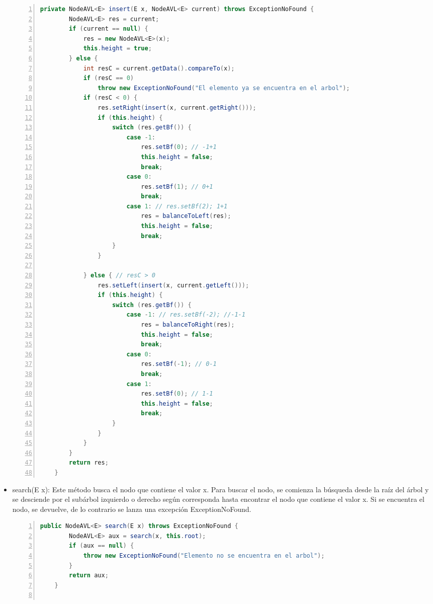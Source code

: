 \documentclass{article}
\begin{document}
\begin{itemize}
\begin{lstlisting}[language=Java, caption=Método insert(E x), numbers=left]
    private NodeAVL<E> insert(E x, NodeAVL<E> current) throws ExceptionNoFound {
        NodeAVL<E> res = current;
        if (current == null) {
            res = new NodeAVL<E>(x);
            this.height = true;
        } else {
            int resC = current.getData().compareTo(x);
            if (resC == 0)
                throw new ExceptionNoFound("El elemento ya se encuentra en el arbol");
            if (resC < 0) {
                res.setRight(insert(x, current.getRight()));
                if (this.height) {
                    switch (res.getBf()) {
                        case -1:
                            res.setBf(0); // -1+1
                            this.height = false;
                            break;
                        case 0:
                            res.setBf(1); // 0+1
                            break;
                        case 1: // res.setBf(2); 1+1
                            res = balanceToLeft(res);
                            this.height = false;
                            break;
                    }
                }
    
            } else { // resC > 0
                res.setLeft(insert(x, current.getLeft()));
                if (this.height) {
                    switch (res.getBf()) {
                        case -1: // res.setBf(-2); //-1-1
                            res = balanceToRight(res);
                            this.height = false;
                            break;
                        case 0:
                            res.setBf(-1); // 0-1
                            break;
                        case 1:
                            res.setBf(0); // 1-1
                            this.height = false;
                            break;
                    }
                }
            }
        }
        return res;
    }
                            \end{lstlisting}
                    \item search(E x): Este método busca el nodo que contiene el valor x. Para buscar el nodo, se comienza la búsqueda desde la raíz del árbol y se desciende por el subárbol izquierdo o derecho según corresponda hasta encontrar el nodo que contiene el valor x. Si se encuentra el nodo, se devuelve, de lo contrario se lanza una excepción ExceptionNoFound.
                            \begin{lstlisting}[language=Java, caption=Método search(E x), numbers=left]
    public NodeAVL<E> search(E x) throws ExceptionNoFound {
        NodeAVL<E> aux = search(x, this.root);
        if (aux == null) {
            throw new ExceptionNoFound("Elemento no se encuentra en el arbol");
        }
        return aux;
    }
    

\end{lstlisting}
\end{itemize}
\end{document}
